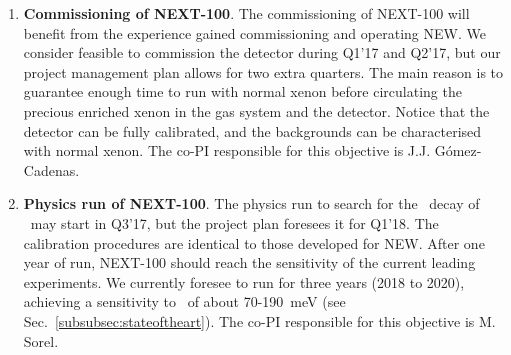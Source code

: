 \begin{enumerate}
\item {\bf Commissioning of NEXT-100}. The commissioning of NEXT-100 will benefit from the experience gained commissioning and operating NEW. We consider feasible to commission the detector during Q1'17 and Q2'17, but our project management plan allows for two extra quarters. The main reason is to guarantee enough time to run with normal xenon before circulating the precious enriched xenon in the gas system and the detector. Notice that the detector can be fully calibrated, and the backgrounds can be characterised with normal xenon. The co-PI responsible for this objective is J.J. G\'omez-Cadenas. 

\item {\bf Physics run of NEXT-100}. The physics run to search for the \bbonu\ decay of \XE\ may start in Q3'17, but the project plan foresees it for Q1'18. The calibration procedures are identical to those developed for NEW. After one year of run, NEXT-100 should reach the sensitivity of the current leading experiments. We currently foresee to run for three years (2018 to 2020), achieving a sensitivity to \mbb\ of about 70-190~meV (see Sec.~\ref{subsubsec:stateoftheart}). The co-PI responsible for this objective is M. Sorel.

\end{enumerate}
